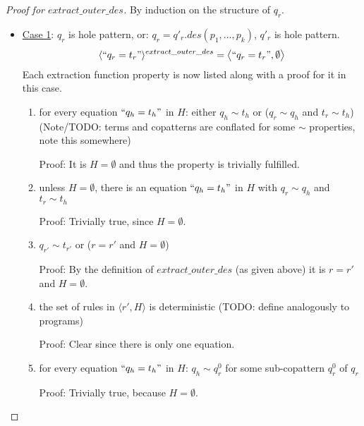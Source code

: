 \documentclass[11pt]{article} %
\begin{document}
\begin{proof}[Proof for $extract\_outer\_des$]

By induction on the structure of $q_r$.

\begin{itemize}

\item \underline{Case 1}: $q_r$ is hole pattern, or: $q_r = q'_r.des(p_1, ..., p_k)$, $q'_r$ is hole pattern.
\begin{equation*}
\langle `` q_r = t_r " \rangle^{extract\_outer\_des} = \big\langle `` q_r = t_r ", \emptyset \big\rangle
\end{equation*}
Each extraction function property is now listed along with a proof for it in this case.

\begin{enumerate}
\item for every equation $`` q_h = t_h "$ in $H$: either $q_h \sim t_h$ or ($q_r \sim q_h$ and $t_r \sim t_h$) (Note/TODO: terms and copatterns are conflated for some $\sim$ properties, note this somewhere)

Proof: It is $H = \emptyset$ and thus the property is trivially fulfilled.

\item unless $H = \emptyset$, there is an equation $`` q_h = t_h "$ in $H$ with $q_r \sim q_h$ and $t_r \sim t_h$

Proof: Trivially true, since $H = \emptyset$.

\item $q_{r'} \sim t_{r'}$ or ($r = r'$ and $H = \emptyset$)

Proof: By the definition of $extract\_outer\_des$ (as given above) it is $r = r'$ and $H = \emptyset$.

\item the set of rules in $\big\langle r', H \big\rangle$ is deterministic (TODO: define analogously to programs)

Proof: Clear since there is only one equation.

\item for every equation $`` q_h = t_h "$ in $H$: $q_h \sim q^0_r$ for some sub-copattern $q^0_r$ of $q_r$

Proof: Trivially true, because $H = \emptyset$.

\end{enumerate}


\end{itemize}
\end{proof}
\end{document}
